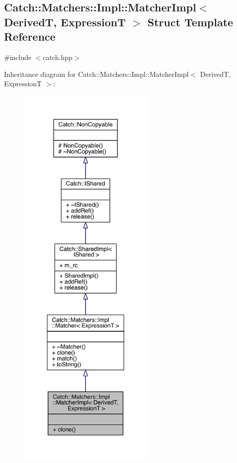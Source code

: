 \hypertarget{a00048}{}\subsection{Catch\+:\+:Matchers\+:\+:Impl\+:\+:Matcher\+Impl$<$ Derived\+T, Expression\+T $>$ Struct Template Reference}
\label{a00048}


{\ttfamily \#include $<$catch.\+hpp$>$}



Inheritance diagram for Catch\+:\+:Matchers\+:\+:Impl\+:\+:Matcher\+Impl$<$ Derived\+T, Expression\+T $>$\+:\nopagebreak
\begin{figure}[H]
\begin{center}
\leavevmode
\includegraphics[height=550pt]{a00339}
\end{center}
\end{figure}


